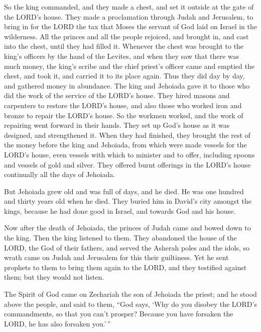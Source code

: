  So the king commanded, and they made a chest, and set it
outside at the gate of the LORD's house.  They made a
proclamation through Judah and Jerusalem, to bring in for the LORD the
tax that Moses the servant of God laid on Israel in the wilderness.
 All the princes and all the people rejoiced, and brought
in, and cast into the chest, until they had filled it. 
Whenever the chest was brought to the king's officers by the hand of the
Levites, and when they saw that there was much money, the king's scribe
and the chief priest's officer came and emptied the chest, and took it,
and carried it to its place again. Thus they did day by day, and
gathered money in abundance.  The king and Jehoiada gave it
to those who did the work of the service of the LORD's house. They hired
masons and carpenters to restore the LORD's house, and also those who
worked iron and bronze to repair the LORD's house.  So the
workmen worked, and the work of repairing went forward in their hands.
They set up God's house as it was designed, and strengthened it.
 When they had finished, they brought the rest of the money
before the king and Jehoiada, from which were made vessels for the
LORD's house, even vessels with which to minister and to offer,
including spoons and vessels of gold and silver. They offered burnt
offerings in the LORD's house continually all the days of Jehoiada.

 But Jehoiada grew old and was full of days, and he died.
He was one hundred and thirty years old when he died.  They
buried him in David's city amongst the kings, because he had done good
in Israel, and towards God and his house.

 Now after the death of Jehoiada, the princes of Judah came
and bowed down to the king. Then the king listened to them.
 They abandoned the house of the LORD, the God of their
fathers, and served the Asherah poles and the idols, so wrath came on
Judah and Jerusalem for this their guiltiness.  Yet he sent
prophets to them to bring them again to the LORD, and they testified
against them; but they would not listen.

 The Spirit of God came on Zechariah the son of Jehoiada
the priest; and he stood above the people, and said to them, ``God says,
`Why do you disobey the LORD's commandments, so that you can't prosper?
Because you have forsaken the LORD, he has also forsaken you.'\,''

